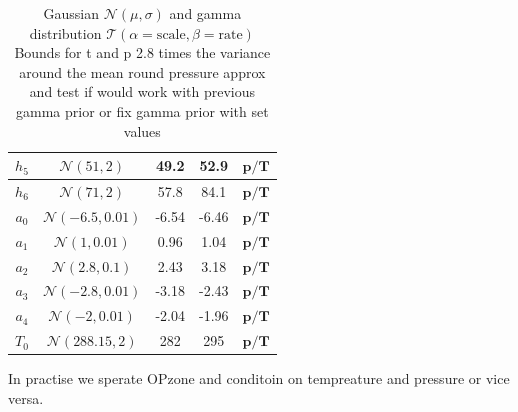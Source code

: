 \begin{table}
\begin{tabular}{ |c||c|c|c|c|   }
		$h_{5}$ &  $\mathcal{N}(51,2)$&49.2 &52.9&$\bm{p/T}$\\ \hline
		$h_{6}$ &  $\mathcal{N}(71,2)$&57.8 &84.1&$\bm{p/T}$\\ \hline
		$a_{0}$ &  $\mathcal{N}(-6.5,0.01)$&-6.54 &-6.46&$\bm{p/T}$\\ \hline
		$a_{1}$ &  $\mathcal{N}(1,0.01)$&0.96 &1.04&$\bm{p/T}$\\ \hline
		$a_{2}$ &  $\mathcal{N}(2.8,0.1)$&2.43 &3.18&$\bm{p/T}$\\ \hline
		$a_{3}$ &  $\mathcal{N}(-2.8,0.01)$&-3.18 &-2.43&$\bm{p/T}$\\ \hline
		$a_{4}$ & $\mathcal{N}(-2,0.01)$ &-2.04 &-1.96&$\bm{p/T}$\\ \hline
		$T_{0}$ &  $\mathcal{N}(288.15,2)$& 282 &295&$\bm{p/T}$\\
		\hline
	\end{tabular}
	\caption{Gaussian $\mathcal{N}(\mu,\sigma)$ and gamma distribution $\mathcal{T}(\alpha = \text{scale}, \beta = \text{rate})$
		Bounds for t and p 2.8 times the variance around the mean
		round pressure approx and  test if would work with previous gamma prior or fix gamma prior with set values}
	\label{tab:priors}
\end{table}

In practise we sperate OPzone and conditoin on tempreature and pressure  or vice versa. 
